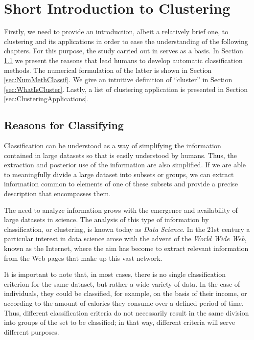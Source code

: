 \chapter{Short Introduction to Clustering}\label{ch:IntroClustering}

Firstly, we need to provide an introduction, albeit a relatively brief one, to clustering and its applications in order to ease the understanding of the following chapters. For this purpose, the study carried out in \cite{Everitt:2009:CA:1538772} serves as a basis. In Section \ref{sec:ReasonsClassif} we present the reasons that lead humans to develop automatic classification methods. The numerical formulation of the latter is shown in Section \ref{sec:NumMethClassif}. We give an intuitive definition of ``cluster'' in Section \ref{sec:WhatIsCluster}. Lastly, a list of clustering application is presented in Section \ref{sec:ClusteringApplications}.

\section{Reasons for Classifying} \label{sec:ReasonsClassif}

Classification can be understood as a way of simplifying the information contained in large datasets so that is easily understood by humans. Thus, the extraction and posterior use of the information are also simplified. If we are able to meaningfully divide a large dataset into subsets or groups, we can extract information common to elements of one of these subsets and provide a precise description that encompasses them.

The need to analyze information grows with the emergence and availability of large datasets in science. The analysis of this type of information by classification, or clustering, is known today as \textit{Data Science}. In the 21st century a particular interest in data science arose with the advent of the \textit{World Wide Web}, known as the Internet, where the aim has become to extract relevant information from the Web pages that make up this vast network.

It is important to note that, in most cases, there is no single classification criterion for the same dataset, but rather a wide variety of data. In the case of individuals, they could be classified, for example, on the basis of their income, or according to the amount of calories they consume over a defined period of time. Thus, different classification criteria do not necessarily result in the same division into groups of the set to be classified; in that way, different criteria will serve different purposes.

